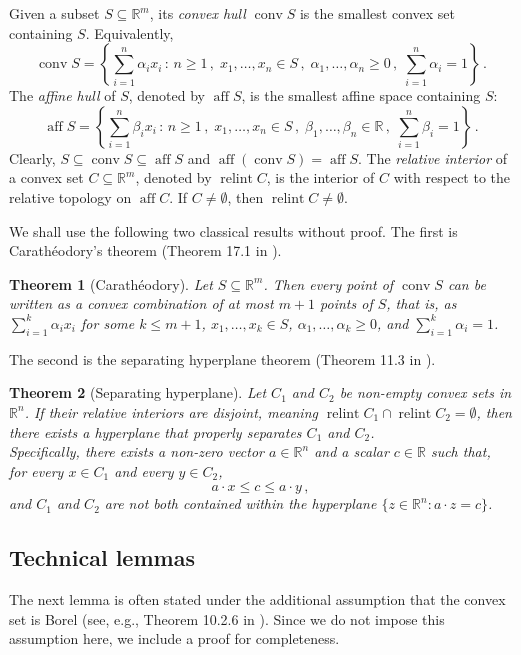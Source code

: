 \documentclass[10pt, a4paper]{article}
\newcommand{\R}{\mathbb R}
\DeclareMathOperator{\aff}{aff}
\DeclareMathOperator{\conv}{conv}
\DeclareMathOperator{\relint}{relint}
\newtheorem{theorem}{Theorem}
\begin{document}
Given a subset $S\subseteq\R^m$, its \emph{convex hull} $\conv S$ is the smallest convex set containing $S$. Equivalently,
$$\conv S = \left\{\sum_{i=1}^n \alpha_i x_i\,:\, n\geq 1\,,\; x_1,\dots,x_n\in S\,,\; \alpha_1,\dots,\alpha_n\geq 0\,,\; \sum_{i=1}^n \alpha_i=1\right\}\,.$$
The \emph{affine hull} of $S$, denoted by $\aff S$, is the smallest affine space containing $S$:
$$\aff S = \left\{\sum_{i=1}^n \beta_i x_i\,:\, n\geq 1\,,\; x_1,\dots,x_n\in S\,,\; \beta_1,\dots,\beta_n\in\R\,,\; \sum_{i=1}^n \beta_i=1\right\}\,.$$
Clearly, $S\subseteq\conv S\subseteq\aff S$ and $\aff(\conv S) = \aff S$. The \emph{relative interior} of a convex set $C\subseteq\R^m$, denoted by $\relint C$, is the interior of $C$ with respect to the relative topology on $\aff C$. If $C\neq\emptyset$, then $\relint C\neq\emptyset$. 

We shall use the following two classical results without proof. The first is Carathéodory's theorem (Theorem 17.1 in \citealt{rockafellar1970convex}).
\begin{theorem}[Carathéodory]\label{thm:caratheodory}
    Let $S\subseteq\R^m$. Then every point of $\conv S$ can be written as a convex combination of at most $m+1$ points of $S$, that is, as $\sum_{i=1}^k \alpha_i x_i$ for some $k\leq m+1$, $x_1,\dots,x_k\in S$, $\alpha_1,\dots,\alpha_k\geq 0$, and $\sum_{i=1}^k \alpha_i=1$.
\end{theorem}
The second is the separating hyperplane theorem (Theorem 11.3 in \citealt{rockafellar1970convex}).
\begin{theorem}[Separating hyperplane]\label{thm:proper_separation}
    Let $C_1$ and $C_2$ be non-empty convex sets in $\R^n$. If their relative interiors are disjoint, meaning $\relint C_1 \cap \relint C_2 = \emptyset$, then there exists a hyperplane that properly separates $C_1$ and $C_2$. \\
    Specifically, there exists a non-zero vector $a \in \R^n$ and a scalar $c \in \R$ such that, for every $x\in C_1$ and every $y\in C_2$,
    $$ a \cdot x \leq c \leq a \cdot y\,,$$
    and $C_1$ and $C_2$ are not both contained within the  hyperplane $\{z \in \R^n : a \cdot z = c\}$.
\end{theorem}
\subsection{Technical lemmas}
The next lemma  is often stated under the additional assumption that the convex set is Borel (see, e.g., Theorem 10.2.6 in \citealt{dudley2002real}). Since we do not impose this assumption here, we include a proof for completeness.
\end{document}

